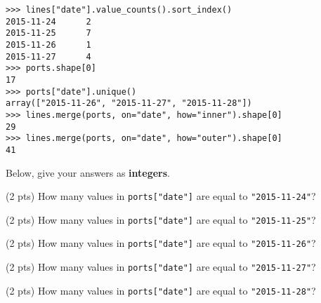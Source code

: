 \documentclass[twoside,12pt]{article}
\begin{document}
\begin{probset}
\begin{prob}[(10 pts)]
\hline

\vspace{-0.1in}

\begin{verbatim}
>>> lines["date"].value_counts().sort_index()
2015-11-24      2
2015-11-25      7
2015-11-26      1
2015-11-27      4
>>> ports.shape[0]
17
>>> ports["date"].unique()
array(["2015-11-26", "2015-11-27", "2015-11-28"])
>>> lines.merge(ports, on="date", how="inner").shape[0]
29
>>> lines.merge(ports, on="date", how="outer").shape[0]
41
\end{verbatim}

\hline

\vspace{0.1in}

Below, give your answers as \textbf{integers}.
\begin{subprobset}
\begin{subprob}(2 pts) How many values in \texttt{ports["date"]} are equal to \texttt{"2015-11-24"}? \inlineresponsebox[1.25in]{}
\end{subprob}

\begin{subprob}(2 pts) How many values in \texttt{ports["date"]} are equal to \texttt{"2015-11-25"}? \inlineresponsebox[1.25in]{}
\end{subprob}

\begin{subprob}(2 pts) How many values in \texttt{ports["date"]} are equal to \texttt{"2015-11-26"}? \inlineresponsebox[1.25in]{}
\end{subprob}

\begin{subprob}(2 pts) How many values in \texttt{ports["date"]} are equal to \texttt{"2015-11-27"}? \inlineresponsebox[1.25in]{}
\end{subprob}

\begin{subprob}(2 pts) How many values in \texttt{ports["date"]} are equal to \texttt{"2015-11-28"}? \inlineresponsebox[1.25in]{}
\end{subprob}

\end{subprobset}

\newpage

\begin{prob}[(4 pts)]


\end{prob}
\end{prob}
\end{probset}
\end{document}
